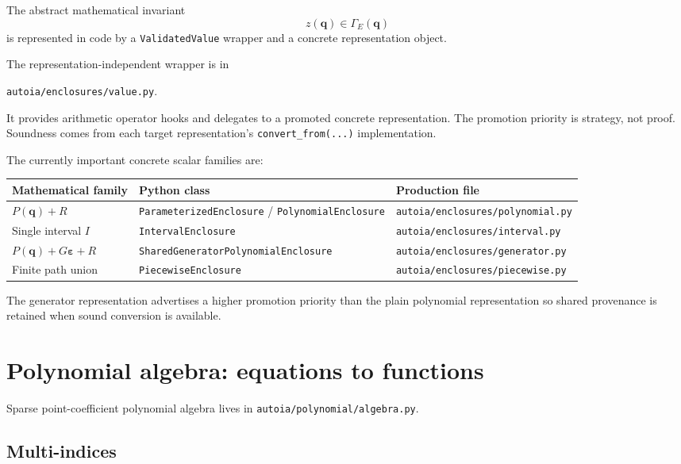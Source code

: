 \documentclass[11pt]{article}
\newcommand{\epsv}{\boldsymbol{\varepsilon}}
\newcommand{\qv}{\mathbf{q}}
\newcommand{\codepath}[1]{\nolinkurl{#1}}
\begin{document}
The abstract mathematical invariant
\[
  z(\qv)\in\Gamma_E(\qv)
\]
is represented in code by a \texttt{ValidatedValue} wrapper and a concrete
representation object.

The representation-independent wrapper is in
\begin{center}
\codepath{autoia/enclosures/value.py}.
\end{center}
It provides arithmetic operator hooks and delegates to a promoted concrete
representation.  The promotion priority is strategy, not proof.  Soundness comes
from each target representation's \texttt{convert\_from(...)} implementation.

The currently important concrete scalar families are:

\begin{longtable}{p{}p{}p{}}
\toprule
Mathematical family & Python class & Production file \\
\midrule
\endhead
\(P(\qv)+R\) & \texttt{ParameterizedEnclosure} / \texttt{PolynomialEnclosure} & \codepath{autoia/enclosures/polynomial.py} \\
Single interval \(I\) & \texttt{IntervalEnclosure} & \codepath{autoia/enclosures/interval.py} \\
\(P(\qv)+G\epsv+R\) & \texttt{SharedGeneratorPolynomialEnclosure} & \codepath{autoia/enclosures/generator.py} \\
Finite path union & \texttt{PiecewiseEnclosure} & \codepath{autoia/enclosures/piecewise.py} \\
\bottomrule
\end{longtable}

The generator representation advertises a higher promotion priority than the
plain polynomial representation so shared provenance is retained when sound
conversion is available.

\section{Polynomial algebra: equations to functions}

Sparse point-coefficient polynomial algebra lives in
\codepath{autoia/polynomial/algebra.py}.

\subsection{Multi-indices}
\end{document}

